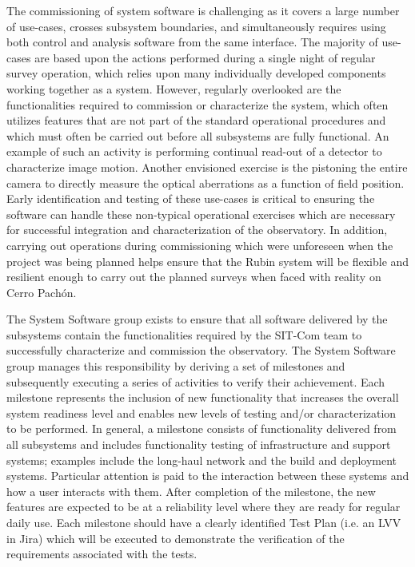 \documentclass[SE,lsstdraft,authoryear,toc]{lsstdoc}
\begin{document}
The commissioning of system software is challenging as it covers a large number of use-cases, crosses subsystem boundaries, and simultaneously requires using both control and analysis software from the same interface.
The majority of use-cases are based upon the actions performed during a single night of regular survey operation, which relies upon many individually developed components working together as a system.
However, regularly overlooked are the functionalities required to commission or characterize the system, which often utilizes features that are not part of the standard operational procedures and which must often be carried out before all subsystems are fully functional.
An example of such an activity is performing continual read-out of a detector to characterize image motion.
Another envisioned exercise is the pistoning the entire camera to directly measure the optical aberrations as a function of field position.
Early identification and testing of these use-cases is critical to ensuring the software can handle these non-typical operational exercises which are necessary for successful integration and characterization of the observatory.
In addition, carrying out operations during commissioning which were unforeseen when the project was being planned helps ensure that the Rubin system will be flexible and resilient enough to carry out the planned surveys when faced with reality on Cerro Pach\'{o}n.

The System Software group exists to ensure that all software delivered by the subsystems contain the functionalities required by the SIT-Com team to successfully characterize and commission the observatory.
The System Software group manages this responsibility by deriving a set of milestones and subsequently executing a series of activities to verify their achievement.
Each milestone represents the inclusion of new functionality that increases the overall system readiness level and enables new levels of testing and/or characterization to be performed.
In general, a milestone consists of functionality delivered from all subsystems and includes functionality testing of infrastructure and support systems; examples include the long-haul network and the build and deployment systems.
Particular attention is paid to the interaction between these systems and how a user interacts with them.
After completion of the milestone, the new features are expected to be at a reliability level where they are ready for regular daily use.
Each milestone should have a clearly identified Test Plan (i.e. an LVV in Jira) which will be executed to demonstrate the verification of the requirements associated with the tests.
\end{document}
